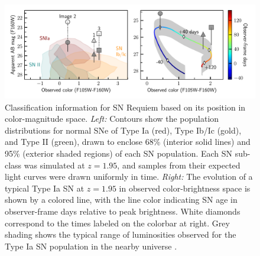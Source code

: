 \documentclass[12pt]{article}
\begin{document}
\clearpage
\begin{figure}
  \centering
    \includegraphics[draft=False, width=\textwidth]{Paper/Figures/classification_contours_timeline.pdf}
    \caption{Classification information for SN Requiem based on its position in color-magnitude space. \emph{Left:} Contours show the population distributions for normal SNe of Type Ia (red), Type Ib/Ic (gold), and Type II (green), drawn to enclose 68\% (interior solid lines) and 95\% (exterior shaded regions) of each SN population.  Each SN sub-class was simulated at $z=1.95$, and samples from their expected light curves were drawn uniformly in time.   \emph{Right:} The evolution of a typical Type Ia SN at $z=1.95$ in observed color-brightness space is shown by a colored line, with the line color indicating SN age in observer-frame days relative to peak brightness.  White diamonds correspond to the times labeled on the colorbar at right. Grey shading shows the typical range of luminosities observed for the Type Ia SN population in the nearby universe \cite{wang_determination_2006}. 
    \label{fig:class}
    }
\end{figure}
\end{document}
